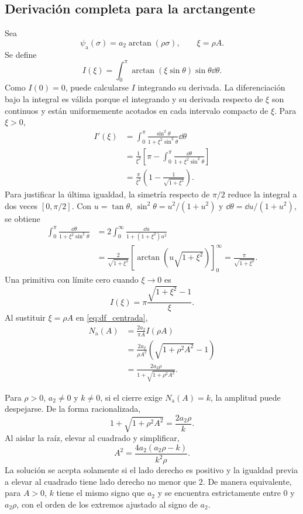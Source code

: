 \fi
\ifnum{}\relax
\subsection{Derivación completa para la arctangente}
\label{app:df_arctan}

Sea
\[
\psi_{\mathrm a}(\sigma)=a_2\arctan(\rho\sigma),
\qquad
\xi=\rho A.
\]
Se define
\[
I(\xi)=
\int_0^\pi\arctan(\xi\sin\theta)\sin\theta\dd\theta.
\]
Como \(I(0)=0\), puede calcularse \(I\) integrando su derivada.
La diferenciación bajo la integral es válida porque el integrando y su
derivada respecto de \(\xi\) son continuos y están uniformemente
acotados en cada intervalo compacto de \(\xi\). Para \(\xi>0\),
\begin{align}
I'(\xi)
&=\int_0^\pi
\frac{\sin^2\theta}{1+\xi^2\sin^2\theta}\dd\theta\nonumber\\
&=\frac1{\xi^2}
\left[
\pi-\int_0^\pi
\frac{\dd\theta}{1+\xi^2\sin^2\theta}
\right]\nonumber\\
&=\frac{\pi}{\xi^2}
\left(1-\frac1{\sqrt{1+\xi^2}}\right).
\label{eq:derivada_integral_arctan}
\end{align}
Para justificar la última igualdad, la simetría respecto de \(\pi/2\)
reduce la integral a dos veces \([0,\pi/2]\). Con
\(u=\tan\theta\), \(\sin^2\theta=u^2/(1+u^2)\) y
\(\dd\theta=\dd u/(1+u^2)\), se obtiene
\begin{align*}
 \int_0^\pi\frac{\dd\theta}{1+\xi^2\sin^2\theta}
 &=2\int_0^\infty\frac{\dd u}{1+(1+\xi^2)u^2}\\
 &=\frac{2}{\sqrt{1+\xi^2}}
 \left[\arctan\!\left(u\sqrt{1+\xi^2}\right)\right]_0^\infty
 =\frac{\pi}{\sqrt{1+\xi^2}}.
\end{align*}
Una primitiva con límite cero cuando \(\xi\to0\) es
\begin{equation}
I(\xi)
=\pi\frac{\sqrt{1+\xi^2}-1}{\xi}.
\label{eq:integral_arctan}
\end{equation}
Al sustituir \(\xi=\rho A\) en
\cref{eq:df_centrada},
\begin{align}
N_{\mathrm a}(A)
&=\frac{2a_2}{\pi A}I(\rho A)\nonumber\\
&=\frac{2a_2}{\rho A^2}
\left(\sqrt{1+\rho^2A^2}-1\right)\nonumber\\
&=\frac{2a_2\rho}
{1+\sqrt{1+\rho^2A^2}}.
\label{eq:df_arctan_derivada}
\end{align}

Para \(\rho>0\), \(a_2\ne0\) y \(k\ne0\), si el cierre exige
\(N_{\mathrm a}(A)=k\), la amplitud puede despejarse.
De la forma racionalizada,
\[
1+\sqrt{1+\rho^2A^2}=\frac{2a_2\rho}{k}.
\]
Al aislar la raíz, elevar al cuadrado y simplificar,
\begin{equation}
A^2
=\frac{4a_2(a_2\rho-k)}{k^2\rho}.
\label{eq:amplitud_arctan}
\end{equation}
La solución se acepta solamente si el lado derecho es positivo y la igualdad
previa a elevar al cuadrado tiene lado derecho no menor que \(2\). De manera
equivalente, para \(A>0\), \(k\) tiene el mismo signo que \(a_2\) y se
encuentra estrictamente entre \(0\) y \(a_2\rho\), con el orden de los
extremos ajustado al signo de \(a_2\).

